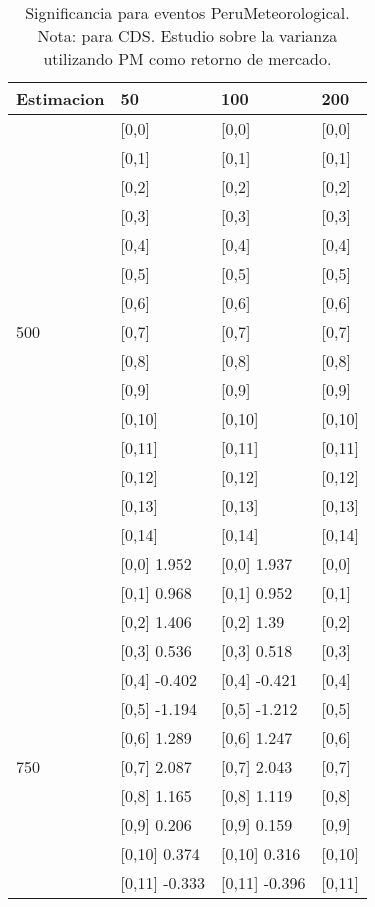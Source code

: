 \begin{table}

\caption{Significancia para eventos PeruMeteorological. Nota: para CDS. Estudio sobre la varianza utilizando PM como retorno de mercado.}
\centering
\begin{tabular}[t]{llll}
\toprule
Estimacion & 50 & 100 & 200\\
\midrule
 & {}[0,0] & {}[0,0] & {}[0,0]\\
 & {}[0,1] & {}[0,1] & {}[0,1]\\
 & {}[0,2] & {}[0,2] & {}[0,2]\\
 & {}[0,3] & {}[0,3] & {}[0,3]\\
 & {}[0,4] & {}[0,4] & {}[0,4]\\
\addlinespace
 & {}[0,5] & {}[0,5] & {}[0,5]\\
 & {}[0,6] & {}[0,6] & {}[0,6]\\
500 & {}[0,7] & {}[0,7] & {}[0,7]\\
 & {}[0,8] & {}[0,8] & {}[0,8]\\
 & {}[0,9] & {}[0,9] & {}[0,9]\\
\addlinespace
 & {}[0,10] & {}[0,10] & {}[0,10]\\
 & {}[0,11] & {}[0,11] & {}[0,11]\\
 & {}[0,12] & {}[0,12] & {}[0,12]\\
 & {}[0,13] & {}[0,13] & {}[0,13]\\
 & {}[0,14] & {}[0,14] & {}[0,14]\\
\addlinespace
 & {}[0,0] 1.952 & {}[0,0] 1.937 & {}[0,0]\\
 & {}[0,1] 0.968 & {}[0,1] 0.952 & {}[0,1]\\
 & {}[0,2] 1.406 & {}[0,2] 1.39 & {}[0,2]\\
 & {}[0,3] 0.536 & {}[0,3] 0.518 & {}[0,3]\\
 & {}[0,4] -0.402 & {}[0,4] -0.421 & {}[0,4]\\
\addlinespace
 & {}[0,5] -1.194 & {}[0,5] -1.212 & {}[0,5]\\
 & {}[0,6] 1.289 & {}[0,6] 1.247 & {}[0,6]\\
750 & {}[0,7] 2.087 & {}[0,7] 2.043 & {}[0,7]\\
 & {}[0,8] 1.165 & {}[0,8] 1.119 & {}[0,8]\\
 & {}[0,9] 0.206 & {}[0,9] 0.159 & {}[0,9]\\
\addlinespace
 & {}[0,10] 0.374 & {}[0,10] 0.316 & {}[0,10]\\
 & {}[0,11] -0.333 & {}[0,11] -0.396 & {}[0,11]\\

\end{tabular}
\end{table}
